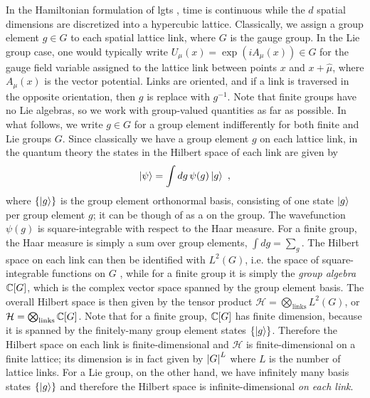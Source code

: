 In the Hamiltonian formulation of \ac{lgt}s \cite{kogut2975hamiltonian, milstead2018qyangmills, ZoharBurrello}, time is continuous while the $d$ spatial dimensions are discretized into a hypercubic lattice.
Classically, we assign a group element $g \in G$ to each spatial lattice link, where $G$ is the gauge group.
In the Lie group case, one would typically write $U_\mu(x) = \exp{(iA_\mu(x))} \in G$ for the gauge field variable assigned to the lattice link between points $x$ and $x + \hat{\mu}$, where $A_\mu(x)$ is the vector potential.
Links are oriented, and if a link is traversed in the opposite orientation, then $g$ is replace with $g^{-1}$.
Note that finite groups have no Lie algebras, so we work with group-valued quantities as far as possible.
In what follows, we write $g \in G$ for a group element indifferently for both finite and Lie groups $G$.
Since classically we have a group element $g$ on each lattice link, in the quantum theory the states in the Hilbert space of each link are given by \cite{milstead2018qyangmills}
\begin{equation}
    \ket{\psi}=\int dg \, \psi(g)\ket{g} \ ,
\end{equation}
where $\{\ket{g}\}$ is the group element orthonormal basis, consisting of one state $\ket{g}$ per group element $g$; it can be though of as a  on the group.
The wavefunction $\psi(g)$ is square-integrable with respect to the Haar measure.
For a finite group, the Haar measure is simply a sum over group elements, $\int dg = \sum_g$.
The Hilbert space on each link can then be identified with $L^2(G)$, i.e. the space of square-integrable functions on $G$ \cite{milstead2018qyangmills}, while for a finite group it is simply the \textit{group algebra} $\mathbb{C}[G]$, which is the complex vector space spanned by the group element basis.
The overall Hilbert space is then given by the tensor product $\mathcal{H} = \bigotimes_{\mathrm{links}} L^2(G)$, or $\mathcal{H} = \bigotimes_{\mathrm{links}} \mathbb{C}[G]$.
Note that for a finite group, $\mathbb{C}[G]$ has finite dimension, because it is spanned by the finitely-many group element states $\{\ket{g}\}$.
Therefore the Hilbert space on each link is finite-dimensional and $\mathcal{H}$ is finite-dimensional on a finite lattice; its dimension is in fact given by $\abs{G}^L$ where $L$ is the number of lattice links.
For a Lie group, on the other hand, we have infinitely many basis states $\{\ket{g}\}$ and therefore the Hilbert space is infinite-dimensional \textit{on each link}.


